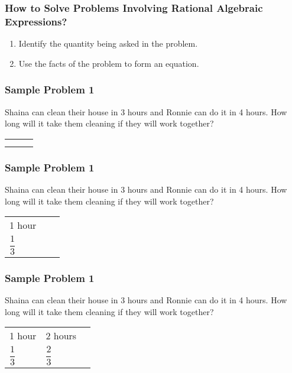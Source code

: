 \documentclass[14pt]{beamer}
\begin{document}
    \begin{frame}
    	\frametitle{How to Solve Problems Involving Rational Algebraic Expressions?}
    	\begin{enumerate}
    		\item Identify the quantity being asked in the problem.
    		\item Use the facts of the problem to form an equation.
    	\end{enumerate}
    \end{frame}

    \begin{frame}
    	\frametitle{Sample Problem 1}
    	Shaina can clean their house in 3 hours and Ronnie can do it in 4 hours. How long will it take them cleaning if they will work together?    	
    	
    	\vspace{1em}
    	\begin{tabularx}{\linewidth}{  e  e  e  }
    		\phantom{1 hour} & \phantom{2 hours}  & \phantom{3 hours} \\
    		 &   &  \\
    	\end{tabularx}
    \end{frame}

    \begin{frame}
    	\frametitle{Sample Problem 1}
    	Shaina can clean their house in 3 hours and Ronnie can do it in 4 hours. How long will it take them cleaning if they will work together?    	
    	
    	\vspace{1em}
    	\begin{tabularx}{\linewidth}{  g e e }
    		 1 hour & \phantom{2 hours}  & \phantom{3 hours} \\
    		 $ \dfrac{1}{3} $ &   &  \\
    	\end{tabularx}
    \end{frame}

    \begin{frame}
    	\frametitle{Sample Problem 1}
    	Shaina can clean their house in 3 hours and Ronnie can do it in 4 hours. How long will it take them cleaning if they will work together?    	
    	
    	\vspace{1em}
    	\begin{tabularx}{\linewidth}{  g g e }
    		1 hour & 2 hours  & \phantom{3 hours} \\
    		$ \dfrac{1}{3} $ & $ \dfrac{2}{3} $  &  \\
    	\end{tabularx}
    \end{frame}
\end{document}
